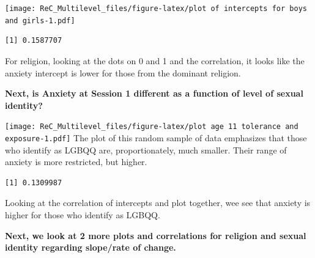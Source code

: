 \documentclass[
  english,
]{book}
\newenvironment{Shaded}{\begin{snugshade}}{\end{snugshade}}
\newcommand{\AttributeTok}[1]{\textcolor[rgb]{0.77,0.63,0.00}{#1}}
\newcommand{\FunctionTok}[1]{\textcolor[rgb]{0.00,0.00,0.00}{#1}}
\newcommand{\NormalTok}[1]{#1}
\newcommand{\SpecialCharTok}[1]{\textcolor[rgb]{0.00,0.00,0.00}{#1}}
\newcommand{\StringTok}[1]{\textcolor[rgb]{0.31,0.60,0.02}{#1}}
\begin{document}
\texttt{[image: ReC\_Multilevel\_files/figure-latex/plot of intercepts for boys and girls-1.pdf]}

\begin{Shaded}
\end{Shaded}

\begin{verbatim}
[1] 0.1587707
\end{verbatim}

For religion, looking at the dots on 0 and 1 and the correlation, it looks like the anxiety intercept is lower for those from the dominant religion.

\textbf{Next, is Anxiety at Session 1 different as a function of level of sexual identity?}

\begin{Shaded}
\end{Shaded}

\texttt{[image: ReC\_Multilevel\_files/figure-latex/plot age 11 tolerance and exposure-1.pdf]}
The plot of this random sample of data emphasizes that those who identify as LGBQQ are, proportionately, much smaller. Their range of anxiety is more restricted, but higher.

\begin{Shaded}
\end{Shaded}

\begin{verbatim}
[1] 0.1309987
\end{verbatim}

Looking at the correlation of intercepts and plot together, wee see that anxiety is higher for those who identify as LGBQQ.

\textbf{Next, we look at 2 more plots and correlations for religion and sexual identity regarding slope/rate of change.}
\end{document}

